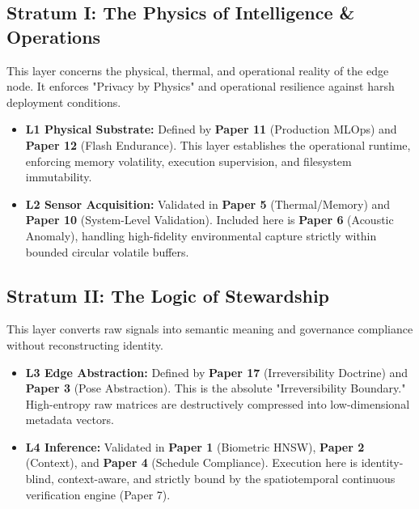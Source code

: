 \documentclass[conference]{IEEEtran}
\begin{document}
\subsection{Stratum I: The Physics of Intelligence \& Operations}
This layer concerns the physical, thermal, and operational reality of the edge node. It enforces "Privacy by Physics" and operational resilience against harsh deployment conditions.
\begin{itemize}
    \item \textbf{L1 Physical Substrate:} Defined by \textbf{Paper 11} (Production MLOps) and \textbf{Paper 12} (Flash Endurance). This layer establishes the operational runtime, enforcing memory volatility, execution supervision, and filesystem immutability. 
    \item \textbf{L2 Sensor Acquisition:} Validated in \textbf{Paper 5} (Thermal/Memory) and \textbf{Paper 10} (System-Level Validation). Included here is \textbf{Paper 6} (Acoustic Anomaly), handling high-fidelity environmental capture strictly within bounded circular volatile buffers.
\end{itemize}

\subsection{Stratum II: The Logic of Stewardship}
This layer converts raw signals into semantic meaning and governance compliance without reconstructing identity. 
\begin{itemize}
    \item \textbf{L3 Edge Abstraction:} Defined by \textbf{Paper 17} (Irreversibility Doctrine) and \textbf{Paper 3} (Pose Abstraction). This is the absolute "Irreversibility Boundary." High-entropy raw matrices are destructively compressed into low-dimensional metadata vectors.
    \item \textbf{L4 Inference:} Validated in \textbf{Paper 1} (Biometric HNSW), \textbf{Paper 2} (Context), and \textbf{Paper 4} (Schedule Compliance). Execution here is identity-blind, context-aware, and strictly bound by the spatiotemporal continuous verification engine (Paper 7). 
\end{itemize}
\end{document}
